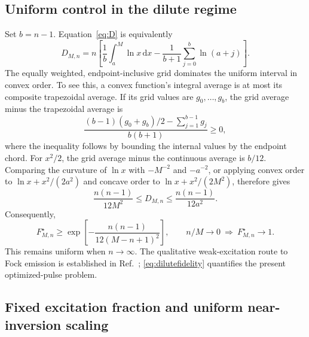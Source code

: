 \documentclass[11pt,a4paper]{article}
\newcommand{\dd}{\,\mathrm d}
\begin{document}
\subsection{Uniform control in the dilute regime}

Set \(b=n-1\). Equation~\eqref{eq:D} is equivalently
\begin{equation}
 D_{M,n}
 =n\left[\frac1b\int_a^M\ln x\dd x
 -\frac1{b+1}\sum_{j=0}^b\ln(a+j)\right].
 \label{eq:gridentropy}
\end{equation}
The equally weighted, endpoint-inclusive grid dominates the uniform
interval in convex order. To see this, a convex function's integral
average is at most its composite trapezoidal average. If its grid
values are \(g_0,\ldots,g_b\), the grid average minus the trapezoidal
average is
\begin{equation}
 \frac{(b-1)(g_0+g_b)/2-\sum_{j=1}^{b-1}g_j}{b(b+1)}\ge0,
\end{equation}
where the inequality follows by bounding the internal values by
the endpoint chord. For \(x^2/2\), the grid average minus the
continuous average is \(b/12\). Comparing the curvature of
\(\ln x\) with \(-M^{-2}\) and \(-a^{-2}\), or applying convex
order to \(\ln x+x^2/(2a^2)\) and concave order to
\(\ln x+x^2/(2M^2)\), therefore gives
\begin{equation}
 \boxed{\frac{n(n-1)}{12M^2}\le D_{M,n}\le
 \frac{n(n-1)}{12a^2}.}
 \label{eq:dilutebound}
\end{equation}
Consequently,
\begin{equation}
 F_{M,n}^\star\ge
 \exp\!\left[-\frac{n(n-1)}{12(M-n+1)^2}\right],
 \qquad n/M\to0\ \Longrightarrow\ F_{M,n}^\star\to1.
 \label{eq:dilutefidelity}
\end{equation}
This remains uniform when \(n\to\infty\). The qualitative
weak-excitation route to Fock emission is established in
Ref.~\cite{liu}; \eqref{eq:dilutefidelity} quantifies the present
optimized-pulse problem.

\subsection{Fixed excitation fraction and uniform near-inversion scaling}
\end{document}
